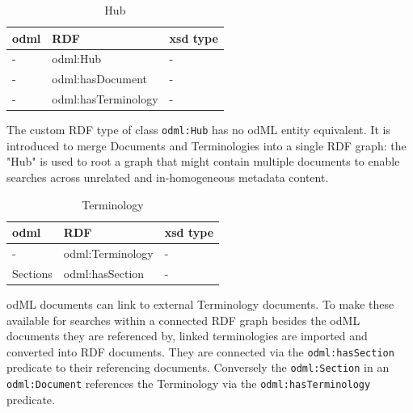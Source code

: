 \documentclass{article}
\begin{document}
\begin{table}
\begin{threeparttable}
\begin{tabular}{p{3.5cm}p{5cm}p{2cm}}
\toprule
    odml            & RDF                           & xsd type \\
\midrule
    -               & odml:Hub                      & - \\
    -               & odml:hasDocument              & - \\
    -               & odml:hasTerminology           & - \\
\bottomrule
\end{tabular}
\caption{Hub}
\begin{tablenotes}
\item The custom RDF type of class \texttt{odml:Hub} has no odML entity equivalent. It is introduced to merge Documents and Terminologies into a single RDF graph: the "Hub" is used to root a graph that might contain multiple documents to enable searches across unrelated and in-homogeneous metadata content.
\end{tablenotes}
\label{table:Hub}
\end{threeparttable}
\end{table}

\begin{table}
\begin{threeparttable}
\begin{tabular}{p{3.5cm}p{5cm}p{2cm}}
\toprule
    odml            & RDF                               & xsd type \\
\midrule
    -               & odml:Terminology                  & - \\
    Sections        & odml:hasSection                   & - \\
\bottomrule
\end{tabular}
\caption{Terminology}
\begin{tablenotes}
\item odML documents can link to external Terminology documents. To make these available for searches within a connected RDF graph besides the odML documents they are referenced by, linked terminologies are imported and converted into RDF documents. They are connected via the \texttt{odml:hasSection} predicate to their referencing documents. Conversely the \texttt{odml:Section} in an \texttt{odml:Document} references the Terminology via the \texttt{odml:hasTerminology} predicate.
\end{tablenotes}
\label{table:Terminology}
\end{threeparttable}
\end{table}
\end{document}
